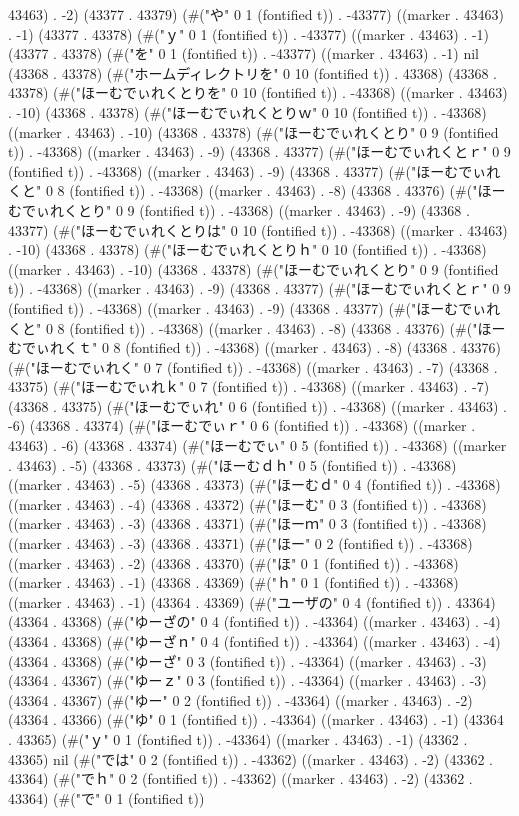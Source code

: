 43463) . -2) (43377 . 43379) (#("や" 0 1 (fontified t)) . -43377) ((marker . 43463) . -1) (43377 . 43378) (#("ｙ" 0 1 (fontified t)) . -43377) ((marker . 43463) . -1) (43377 . 43378) (#("を" 0 1 (fontified t)) . -43377) ((marker . 43463) . -1) nil (43368 . 43378) (#("ホームディレクトリを" 0 10 (fontified t)) . 43368) (43368 . 43378) (#("ほーむでぃれくとりを" 0 10 (fontified t)) . -43368) ((marker . 43463) . -10) (43368 . 43378) (#("ほーむでぃれくとりｗ" 0 10 (fontified t)) . -43368) ((marker . 43463) . -10) (43368 . 43378) (#("ほーむでぃれくとり" 0 9 (fontified t)) . -43368) ((marker . 43463) . -9) (43368 . 43377) (#("ほーむでぃれくとｒ" 0 9 (fontified t)) . -43368) ((marker . 43463) . -9) (43368 . 43377) (#("ほーむでぃれくと" 0 8 (fontified t)) . -43368) ((marker . 43463) . -8) (43368 . 43376) (#("ほーむでぃれくとり" 0 9 (fontified t)) . -43368) ((marker . 43463) . -9) (43368 . 43377) (#("ほーむでぃれくとりは" 0 10 (fontified t)) . -43368) ((marker . 43463) . -10) (43368 . 43378) (#("ほーむでぃれくとりｈ" 0 10 (fontified t)) . -43368) ((marker . 43463) . -10) (43368 . 43378) (#("ほーむでぃれくとり" 0 9 (fontified t)) . -43368) ((marker . 43463) . -9) (43368 . 43377) (#("ほーむでぃれくとｒ" 0 9 (fontified t)) . -43368) ((marker . 43463) . -9) (43368 . 43377) (#("ほーむでぃれくと" 0 8 (fontified t)) . -43368) ((marker . 43463) . -8) (43368 . 43376) (#("ほーむでぃれくｔ" 0 8 (fontified t)) . -43368) ((marker . 43463) . -8) (43368 . 43376) (#("ほーむでぃれく" 0 7 (fontified t)) . -43368) ((marker . 43463) . -7) (43368 . 43375) (#("ほーむでぃれｋ" 0 7 (fontified t)) . -43368) ((marker . 43463) . -7) (43368 . 43375) (#("ほーむでぃれ" 0 6 (fontified t)) . -43368) ((marker . 43463) . -6) (43368 . 43374) (#("ほーむでぃｒ" 0 6 (fontified t)) . -43368) ((marker . 43463) . -6) (43368 . 43374) (#("ほーむでぃ" 0 5 (fontified t)) . -43368) ((marker . 43463) . -5) (43368 . 43373) (#("ほーむｄｈ" 0 5 (fontified t)) . -43368) ((marker . 43463) . -5) (43368 . 43373) (#("ほーむｄ" 0 4 (fontified t)) . -43368) ((marker . 43463) . -4) (43368 . 43372) (#("ほーむ" 0 3 (fontified t)) . -43368) ((marker . 43463) . -3) (43368 . 43371) (#("ほーｍ" 0 3 (fontified t)) . -43368) ((marker . 43463) . -3) (43368 . 43371) (#("ほー" 0 2 (fontified t)) . -43368) ((marker . 43463) . -2) (43368 . 43370) (#("ほ" 0 1 (fontified t)) . -43368) ((marker . 43463) . -1) (43368 . 43369) (#("ｈ" 0 1 (fontified t)) . -43368) ((marker . 43463) . -1) (43364 . 43369) (#("ユーザの" 0 4 (fontified t)) . 43364) (43364 . 43368) (#("ゆーざの" 0 4 (fontified t)) . -43364) ((marker . 43463) . -4) (43364 . 43368) (#("ゆーざｎ" 0 4 (fontified t)) . -43364) ((marker . 43463) . -4) (43364 . 43368) (#("ゆーざ" 0 3 (fontified t)) . -43364) ((marker . 43463) . -3) (43364 . 43367) (#("ゆーｚ" 0 3 (fontified t)) . -43364) ((marker . 43463) . -3) (43364 . 43367) (#("ゆー" 0 2 (fontified t)) . -43364) ((marker . 43463) . -2) (43364 . 43366) (#("ゆ" 0 1 (fontified t)) . -43364) ((marker . 43463) . -1) (43364 . 43365) (#("ｙ" 0 1 (fontified t)) . -43364) ((marker . 43463) . -1) (43362 . 43365) nil (#("では" 0 2 (fontified t)) . -43362) ((marker . 43463) . -2) (43362 . 43364) (#("でｈ" 0 2 (fontified t)) . -43362) ((marker . 43463) . -2) (43362 . 43364) (#("で" 0 1 (fontified t)) 